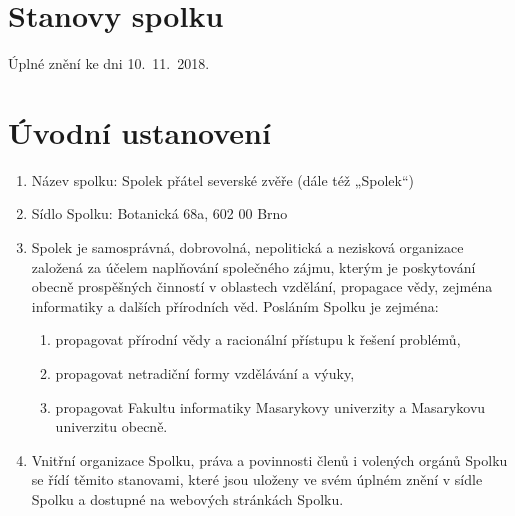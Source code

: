 \documentclass[11pt,a4paper]{article}
\begin{document}
\section*{\Huge{}Stanovy spolku}

Úplné znění ke dni 10.\ 11.\ 2018.

\section{Úvodní ustanovení}
\begin{enumerate}[itemsep=0pt]
    \item Název spolku: Spolek přátel severské zvěře (dále též „Spolek“)
    \item Sídlo Spolku: Botanická 68a, 602 00 Brno
    \item Spolek je samosprávná, dobrovolná, nepolitická a nezisková organizace 
    založená za účelem naplňování společného zájmu, kterým je poskytování obecně
    prospěšných činností v oblastech vzdělání, propagace vědy, zejména 
    informatiky a dalších přírodních věd. Posláním Spolku je zejména: 
    \begin{enumerate}[itemsep=0pt,topsep=0pt]
        \item propagovat přírodní vědy a racionální přístupu k řešení problémů,
        \item propagovat netradiční formy vzdělávání a výuky,
        \item propagovat Fakultu informatiky Masarykovy univerzity a Masarykovu univerzitu obecně.
    \end{enumerate}
    \item Vnitřní organizace Spolku, práva a povinnosti členů i volených orgánů 
    Spolku se řídí těmito stanovami, které jsou uloženy ve svém úplném znění 
    v sídle Spolku a dostupné na webových stránkách Spolku.
\end{enumerate}
\end{document}
